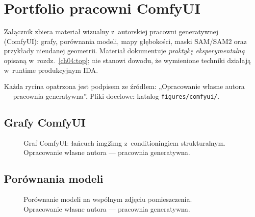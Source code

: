 \chapter{Portfolio pracowni ComfyUI}
\label{app:g:top}

Załącznik zbiera materiał wizualny z~autorskiej pracowni generatywnej (ComfyUI): grafy, porównania modeli, mapy głębokości, maski SAM/SAM2 oraz przykłady nieudanej geometrii. Materiał dokumentuje \emph{praktykę eksperymentalną} opisaną w~rozdz.~\ref{ch04:top}; nie stanowi dowodu, że wymienione techniki działają w~runtime produkcyjnym IDA.

Każda rycina opatrzona jest podpisem ze źródłem: „Opracowanie własne autora --- pracownia generatywna”. Pliki docelowe: katalog \texttt{figures/comfyui/}.

\section{Grafy ComfyUI}
\label{app:g:sec:graphs}

\begin{figure}[htbp]
  \centering
  \caption{Graf ComfyUI: łańcuch img2img z~conditioningiem strukturalnym.
  Opracowanie własne autora --- pracownia generatywna.}
  \label{app:g:fig:graph}
\end{figure}


\section{Porównania modeli}
\label{app:g:sec:models}

\begin{figure}[htbp]
  \centering
  \caption{Porównanie modeli na wspólnym zdjęciu pomieszczenia.
  Opracowanie własne autora --- pracownia generatywna.}
  \label{app:g:fig:models}
\end{figure}

